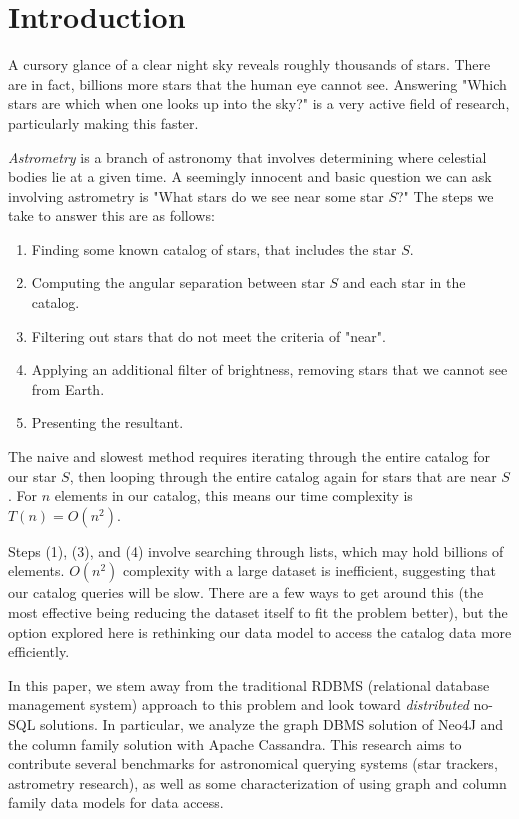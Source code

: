 \section{Introduction}\label{sec:introduction}
A cursory glance of a clear night sky reveals roughly thousands of stars.
There are in fact, billions more stars that the human eye cannot see.
Answering "Which stars are which when one looks up into the sky?" is a very active field of research, particularly
making this faster.

\textit{Astrometry} is a branch of astronomy that involves determining where celestial
bodies lie at a given time.
A seemingly innocent and basic question we can ask involving astrometry is "What stars do we see near some star $S$?"
The steps we take to answer this are as follows:
\begin{enumerate}
    \item Finding some known catalog of stars, that includes the star $S$.
    \item Computing the angular separation between star $S$ and each star in the catalog.
    \item Filtering out stars that do not meet the criteria of "near".
    \item Applying an additional filter of brightness, removing stars that we cannot see from Earth.
    \item Presenting the resultant.
\end{enumerate}

The naive and slowest method requires iterating through the entire catalog for our star $S$, then looping through the
entire catalog again for stars that are near $S$.
For $n$ elements in our catalog, this means our time complexity is $T(n) = O\left( n^2 \right)$.

Steps (1), (3), and (4) involve searching through lists, which may hold billions of elements.
$O\left(n^2\right)$ complexity with a large dataset is inefficient, suggesting that our catalog queries will be slow.
There are a few ways to get around this (the most effective being reducing the dataset itself to fit the problem
better), but the option explored here is rethinking our data model to access the catalog data more efficiently.

In this paper, we stem away from the traditional RDBMS (relational database management system) approach to this
problem and look toward \textit{distributed} no-SQL solutions.
In particular, we analyze the graph DBMS solution of Neo4J and the column family solution with Apache Cassandra.
This research aims to contribute several benchmarks for astronomical querying systems (star trackers, astrometry
research), as well as some characterization of using graph and column family data models for data access.